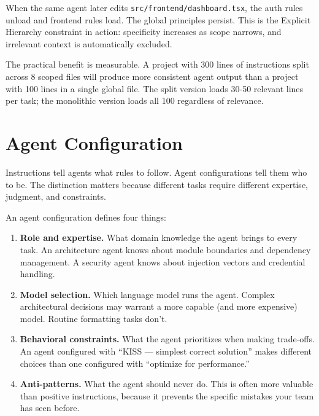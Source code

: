 \documentclass[
  a4paper,
  DIV=11,
  numbers=noendperiod]{scrreprt}
\providecommand{\tightlist}{%
  \setlength{\itemsep}{0pt}\setlength{\parskip}{0pt}}
\begin{document}
When the same agent later edits \texttt{src/frontend/dashboard.tsx}, the
auth rules unload and frontend rules load. The global principles
persist. This is the Explicit Hierarchy constraint in action:
specificity increases as scope narrows, and irrelevant context is
automatically excluded.

The practical benefit is measurable. A project with 300 lines of
instructions split across 8 scoped files will produce more consistent
agent output than a project with 100 lines in a single global file. The
split version loads 30-50 relevant lines per task; the monolithic
version loads all 100 regardless of relevance.

\section{Agent Configuration}\label{agent-configuration}

Instructions tell agents what rules to follow. Agent configurations tell
them who to be. The distinction matters because different tasks require
different expertise, judgment, and constraints.

An agent configuration defines four things:

\begin{enumerate}
\def\labelenumi{\arabic{enumi}.}
\tightlist
\item
  \textbf{Role and expertise.} What domain knowledge the agent brings to
  every task. An architecture agent knows about module boundaries and
  dependency management. A security agent knows about injection vectors
  and credential handling.
\item
  \textbf{Model selection.} Which language model runs the agent. Complex
  architectural decisions may warrant a more capable (and more
  expensive) model. Routine formatting tasks don't.
\item
  \textbf{Behavioral constraints.} What the agent prioritizes when
  making trade-offs. An agent configured with ``KISS --- simplest
  correct solution'' makes different choices than one configured with
  ``optimize for performance.''
\item
  \textbf{Anti-patterns.} What the agent should never do. This is often
  more valuable than positive instructions, because it prevents the
  specific mistakes your team has seen before.
\end{enumerate}
\end{document}
